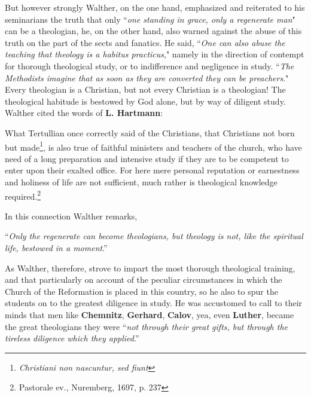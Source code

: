 But however strongly Walther, on the one hand, emphasized and reiterated to his seminarians the truth that only ``\textit{one standing in grace, only a regenerate man}" can be a theologian, he, on the other hand, also warned against the abuse of this truth on the part of the sects and fanatics. He said, ``\textit{One can also abuse the teaching that theology is a habitus practicus}," namely in the direction of contempt for thorough theological study, or to indifference and negligence in study. ``\textit{The Methodists imagine that as soon as they are converted they can be preachers}." Every theologian is a Christian, but not every Christian is a theologian! The theological habitude is bestowed by God alone, but by way of diligent study.
 Walther cited the words of \textbf{L. Hartmann}: \begin{fancyquotes} What Tertullian once correctly said of the Christians, that Christians not born but made\footnote{\textit{Christiani non nascuntur, sed fiunt}}, is also true of faithful ministers and teachers of the church, who have need of a long preparation and intensive study if they are to be competent to enter upon their exalted office. For here mere personal reputation or earnestness and holiness of life are not sufficient, much rather is theological knowledge required.\footnote{Pastorale ev., Nuremberg, 1697, p. 237}\end{fancyquotes} In this connection Walther remarks, \begin{displayquote}``\textit{Only the regenerate can become theologians, but theology is not, like the spiritual life, bestowed in a moment}.''\end{displayquote}

As Walther, therefore, strove to impart the most thorough theological training, and that particularly on account of the peculiar circumstances in which the Church of the Reformation is placed in this country, so he also to spur the students on to the greatest diligence in study. He was accustomed to call to their minds that men like \textbf{Chemnitz}, \textbf{Gerhard}, \textbf{Calov}, yea, even \textbf{Luther}, became the great theologians they were ``\textit{not through their great gifts, but through the tireless diligence which they applied}.''

